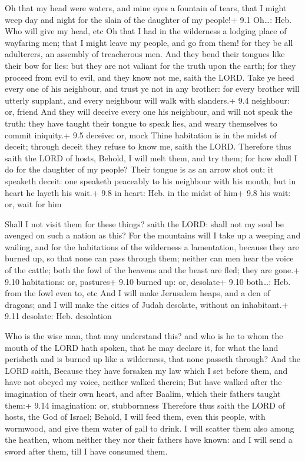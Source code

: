  Oh that my head were waters, and mine eyes a fountain of
tears, that I might weep day and night for the slain of the daughter of
my people!+ 9.1 Oh\ldots: Heb. Who will give my head, etc 
Oh that I had in the wilderness a lodging place of wayfaring men; that I
might leave my people, and go from them! for they be all adulterers, an
assembly of treacherous men.  And they bend their tongues
like their bow for lies: but they are not valiant for the truth upon the
earth; for they proceed from evil to evil, and they know not me, saith
the LORD.  Take ye heed every one of his neighbour, and
trust ye not in any brother: for every brother will utterly supplant,
and every neighbour will walk with slanders.+ 9.4 neighbour: or, friend
 And they will deceive every one his neighbour, and will not
speak the truth: they have taught their tongue to speak lies, and weary
themselves to commit iniquity.+ 9.5 deceive: or, mock  Thine
habitation is in the midst of deceit; through deceit they refuse to know
me, saith the LORD.  Therefore thus saith the LORD of hosts,
Behold, I will melt them, and try them; for how shall I do for the
daughter of my people?  Their tongue is as an arrow shot
out; it speaketh deceit: one speaketh peaceably to his neighbour with
his mouth, but in heart he layeth his wait.+ 9.8 in heart: Heb. in the
midst of him+ 9.8 his wait: or, wait for him

 Shall I not visit them for these things? saith the LORD:
shall not my soul be avenged on such a nation as this?  For
the mountains will I take up a weeping and wailing, and for the
habitations of the wilderness a lamentation, because they are burned up,
so that none can pass through them; neither can men hear the voice of
the cattle; both the fowl of the heavens and the beast are fled; they
are gone.+ 9.10 habitations: or, pastures+ 9.10 burned up: or, desolate+
9.10 both\ldots: Heb. from the fowl even to, etc  And I
will make Jerusalem heaps, and a den of dragons; and I will make the
cities of Judah desolate, without an inhabitant.+ 9.11 desolate: Heb.
desolation

 Who is the wise man, that may understand this? and who
is he to whom the mouth of the LORD hath spoken, that he may declare it,
for what the land perisheth and is burned up like a wilderness, that
none passeth through?  And the LORD saith, Because they
have forsaken my law which I set before them, and have not obeyed my
voice, neither walked therein;  But have walked after the
imagination of their own heart, and after Baalim, which their fathers
taught them:+ 9.14 imagination: or, stubbornness  Therefore
thus saith the LORD of hosts, the God of Israel; Behold, I will feed
them, even this people, with wormwood, and give them water of gall to
drink.  I will scatter them also among the heathen, whom
neither they nor their fathers have known: and I will send a sword after
them, till I have consumed them.


